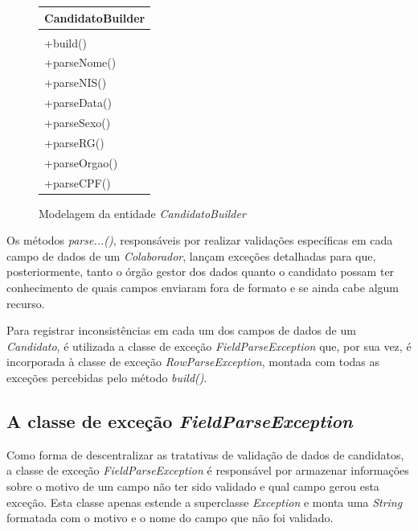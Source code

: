 \documentclass[
	12pt,			%
	openright,		%
	oneside,	
	a4paper,		%
	english,		%
	brazil			%
]{abntex2/abntex2}  %
\begin{document}
	\begin{figure}[H]
		\begin{center}
			
			\caption{Modelagem da entidade \textit{CandidatoBuilder}}
			\label{candidatobuilder-uml}
			
			\begin{tabular}{|l|}
				\hline
				\multicolumn{1}{|c|}{\textbf{CandidatoBuilder}} \\ \hline
				\\ \hline
				+build() \\
				+parseNome() \\
				+parseNIS() \\
				+parseData() \\
				+parseSexo() \\
				+parseRG() \\
				+parseOrgao() \\
				+parseCPF() \\ \hline
			\end{tabular}
		
		\end{center}
	\end{figure}
	
	Os métodos \textit{parse...()}, responsáveis por realizar validações específicas em cada campo de dados de um \textit{Colaborador}, lançam exceções detalhadas para que, posteriormente, tanto o órgão gestor dos dados quanto o candidato possam ter conhecimento de quais campos enviaram fora de formato e se ainda cabe algum recurso.
	
	Para registrar inconsistências em cada um dos campos de dados de um \textit{Candidato}, é utilizada a classe de exceção \textit{FieldParseException} que, por sua vez, é incorporada à classe de exceção \textit{RowParseException}, montada com todas as exceções percebidas pelo método \textit{build()}.

	\subsection{A classe de exceção \textit{FieldParseException}}
	
	Como forma de descentralizar as tratativas de validação de dados de candidatos, a classe de exceção \textit{FieldParseException} é responsável por armazenar informações sobre o motivo de um campo não ter sido validado e qual campo gerou esta exceção. Esta classe apenas estende a superclasse \textit{Exception} e monta uma \textit{String} formatada com o motivo e o nome do campo que não foi validado.
\end{document}
